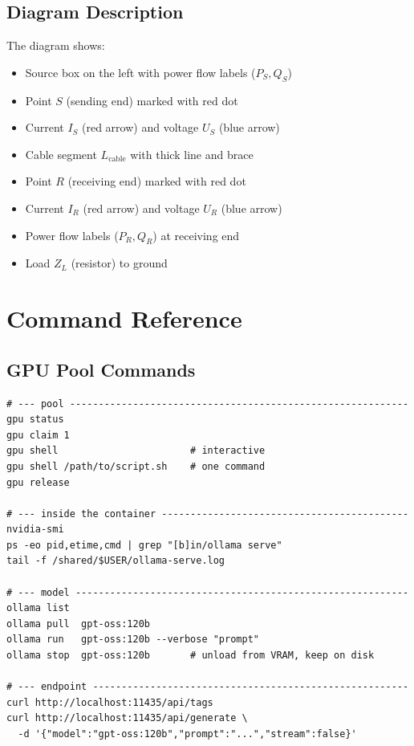 \documentclass[11pt,a4paper]{article}
\begin{document}
\section{Diagram Description}

The diagram shows:
\begin{itemize}
  \item Source box on the left with power flow labels ($P_S, Q_S$)
  \item Point $S$ (sending end) marked with red dot
  \item Current $I_S$ (red arrow) and voltage $U_S$ (blue arrow)
  \item Cable segment $L_{\text{cable}}$ with thick line and brace
  \item Point $R$ (receiving end) marked with red dot
  \item Current $I_R$ (red arrow) and voltage $U_R$ (blue arrow)
  \item Power flow labels ($P_R, Q_R$) at receiving end
  \item Load $Z_L$ (resistor) to ground
\end{itemize}

\chapter{Command Reference}

\section{GPU Pool Commands}

\begin{lstlisting}
# --- pool -----------------------------------------------------------
gpu status
gpu claim 1
gpu shell                       # interactive
gpu shell /path/to/script.sh    # one command
gpu release

# --- inside the container -------------------------------------------
nvidia-smi
ps -eo pid,etime,cmd | grep "[b]in/ollama serve"
tail -f /shared/$USER/ollama-serve.log

# --- model ----------------------------------------------------------
ollama list
ollama pull  gpt-oss:120b
ollama run   gpt-oss:120b --verbose "prompt"
ollama stop  gpt-oss:120b       # unload from VRAM, keep on disk

# --- endpoint -------------------------------------------------------
curl http://localhost:11435/api/tags
curl http://localhost:11435/api/generate \
  -d '{"model":"gpt-oss:120b","prompt":"...","stream":false}'
\end{lstlisting}
\end{document}
